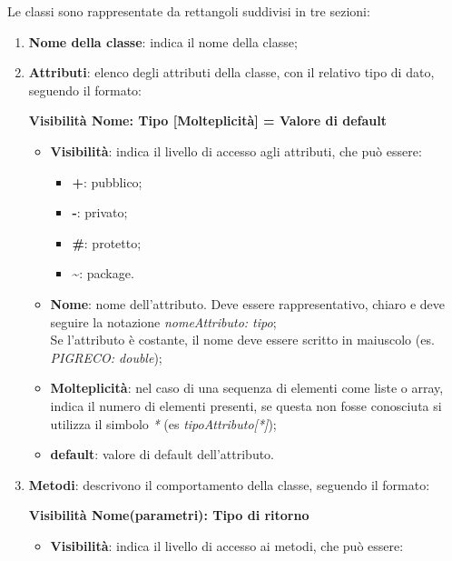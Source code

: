Le classi sono rappresentate da rettangoli suddivisi in tre sezioni:
\begin{enumerate}
	\item \textbf{Nome della classe}: indica il nome della classe;
	\item \textbf{Attributi}: elenco degli attributi della classe, con il relativo tipo di dato, seguendo il formato: 
	\begin{center}
		\textbf{Visibilità Nome: Tipo [Molteplicità] = Valore di default}\end{center}
	      \begin{itemize}
		      \item \textbf{Visibilità}: indica il livello di accesso agli attributi, che può essere:
		            \begin{itemize}
			            \item \textbf{+}: pubblico;
			            \item \textbf{-}: privato;
			            \item \textbf{\#}: protetto;
			            \item \textbf{\textasciitilde}: package.
		            \end{itemize}
		      \item \textbf{Nome}: nome dell'attributo. Deve essere rappresentativo, chiaro e deve seguire la notazione \textit{nomeAttributo: tipo}; \\ Se l'attributo è costante, il nome deve essere scritto in maiuscolo (es. \textit{PIGRECO: double});
		      \item \textbf{Molteplicità}: nel caso di una sequenza di elementi come liste o array, indica il numero di elementi presenti, se questa non fosse conosciuta si utilizza il simbolo \textit{*} (es \textit{tipoAttributo[*]});
		      \item \textbf{default}: valore di default dell'attributo.
	      \end{itemize}
	\item \textbf{Metodi}: descrivono il comportamento della classe, seguendo il formato: \\ \begin{center}\textbf{Visibilità Nome(parametri): Tipo di ritorno}\end{center}
	      \begin{itemize}
		      \item \textbf{Visibilità}: indica il livello di accesso ai metodi, che può essere:
		            \begin{itemize}

\end{itemize}
\end{itemize}
\end{enumerate}
